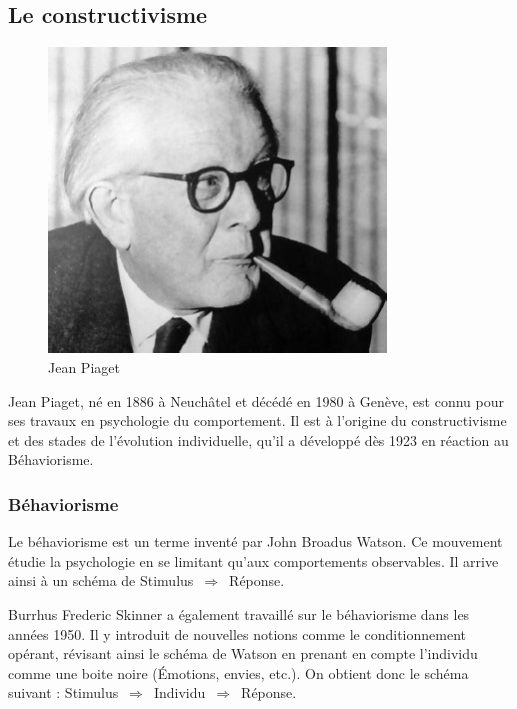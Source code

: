 \subsection{Le constructivisme}
\begin{minipage}[H]{0.3\linewidth}
  \begin{figure}[H]
  \centering
  \includegraphics[width=0.8\textwidth]{../resources/illustrations/piaget}
  \caption{Jean Piaget}
  \end{figure}
\end{minipage}
\begin{minipage}[H]{0.7\linewidth}
Jean Piaget, né en 1886 à Neuchâtel et décédé en 1980 à Genève, est connu pour ses travaux en psychologie du comportement. Il est à l'origine du constructivisme et des stades de l'évolution individuelle, qu'il a développé dès 1923 en réaction au Béhaviorisme.
\vspace{.8cm}
\end{minipage}

\subsubsection{Béhaviorisme}
Le béhaviorisme est un terme inventé par John Broadus Watson. Ce mouvement étudie la psychologie en se limitant qu'aux comportements observables. Il arrive ainsi à un schéma de Stimulus~$\Rightarrow$~Réponse.

Burrhus Frederic Skinner a également travaillé sur le béhaviorisme dans les années 1950. Il y introduit de nouvelles notions comme le conditionnement opérant, révisant ainsi le schéma de Watson en prenant en compte l'individu comme une \og boite noire \fg{} (Émotions, envies, etc.). On obtient donc le schéma suivant : Stimulus~$\Rightarrow$~Individu~$\Rightarrow$~Réponse.

